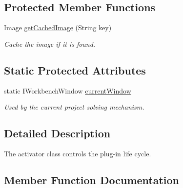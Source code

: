 \subsection*{Protected Member Functions}
\begin{DoxyCompactItemize}
\item 
Image \hyperlink{classcom_1_1fware_1_1cspdt_1_1cspm_1_1editor_1_1_csp_m_editor_plugin_a2386db9ed985b9049c0ba90a3fbf8695}{get\+Cached\+Image} (String key)
\begin{DoxyCompactList}\small\item\em Cache the image if it is found. \end{DoxyCompactList}\end{DoxyCompactItemize}
\subsection*{Static Protected Attributes}
\begin{DoxyCompactItemize}
\item 
static I\+Workbench\+Window \hyperlink{classcom_1_1fware_1_1cspdt_1_1cspm_1_1editor_1_1_csp_m_editor_plugin_a00372fb921d6f5cc3ee5b79bb1fa065a}{current\+Window}
\begin{DoxyCompactList}\small\item\em Used by the current project solving mechanism. \end{DoxyCompactList}\end{DoxyCompactItemize}


\subsection{Detailed Description}
The activator class controls the plug-\/in life cycle. 

\subsection{Member Function Documentation}
\mbox{\label{classcom_1_1fware_1_1cspdt_1_1cspm_1_1editor_1_1_csp_m_editor_plugin_a2386db9ed985b9049c0ba90a3fbf8695}} 
